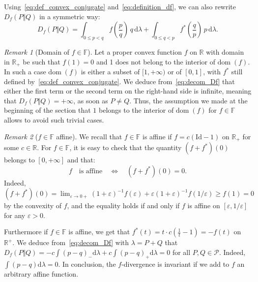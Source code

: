 \documentclass[12pt]{article}
\newcommand{\cp}{{\mathcal P}}
\newcommand{\F}{{\mathbb F}}
\newcommand{\R}{{\mathbb R}}
\newcommand{\dom}{{\mathrm{dom}}\;}
\newcommand{\id}{\mathrm{Id}}
\newcommand{\rd}{\mathrm{d}}
\theoremstyle{plain}
\theoremstyle{remark}
\newtheorem{rem}{Remark}
\begin{document}
Using~\eqref{eq:def_convex_conjugate}
and~\eqref{eq:definition_df}, we can also rewrite  $D_f(P\Vert Q)$
in a symmetric way:
\begin{equation}
   \label{eq:decom_Df}
  D_f(P\Vert Q)
= \int_{0\leq p<q} f\left(\frac{p}{q}\right) \, q  \, \rd \lambda
     + \int_{0\leq  q<p} f^*\left(\frac{q}{p}\right)\, p \, \rd \lambda.
\end{equation}


\begin{rem}[Domain of $f\in \F$]
  \label{rem:domain}
Let a  proper convex function $f$ on $\R$ with domain in $\R_+$ be such that
  $f(1)=0$ and 1 does not belong to the interior of $\dom(f)$. In such a case
  $\dom(f)$ is either a subset of $[1, +\infty )$ or of $ [0,
  1]$, with $f^*$ still defined by~\eqref{eq:def_convex_conjugate}. We
  deduce from~\eqref{eq:decom_Df}  that either the first term or the second term
   on the right-hand side is infinite, meaning that $  D_f(P\Vert Q)=+\infty $, as soon as
  $P\neq Q$. Thus, the assumption we made at the beginning of the section that $1$ belongs to the
  interior of $\dom(f)$ for  $f\in \F$ allows to avoid such trivial cases.
\end{rem}

\begin{rem}[$f\in \F $ affine]
  \label{rem:affine}
We recall that $f\in \F$ is affine if  $f=c(\id -1)$ on $\R_+$ for some
$c\in \R$.
  For $f\in \F$, it is easy to check that the quantity $(f+f^*)(0)$ belongs to
$[0, +\infty ]$ and  that:
\[
  f\quad\text{is affine}\quad
  \Longleftrightarrow\quad
  (f+f^*)(0)=0.
\]
Indeed, $(f+f^*)(0)= \lim_{\varepsilon \rightarrow 0+} (1+\varepsilon)^{-1}
 f(\varepsilon) + \varepsilon (1+\varepsilon)^{-1} f(1/\varepsilon) \geq
 f(1)=0$ by the convexity of $f$, and the equality holds if and only if
 $f$ is affine on $[\varepsilon, 1/\varepsilon]$ for any $\varepsilon>0$.


Furthermore if $f\in \F$ is affine,  we get
that  $f^*(t) = t \cdot c (\frac 1t - 1) =-f(t)$ on $\R^+$. We deduce
from~\eqref{eq:decom_Df} with $\lambda=P+Q$
that $   D_f(P\Vert Q) = - c \int (p-q)_- \rd \lambda+ c \int (p-q)_+ \rd \lambda=0$ for all $P, Q\in \cp$.
Indeed, $\int(p-q) \rd \lambda = 0$. In conclusion, the $f$-divergence is invariant if we add
to $f$ an arbitrary affine function.
\end{rem}


\medskip
\end{document}
